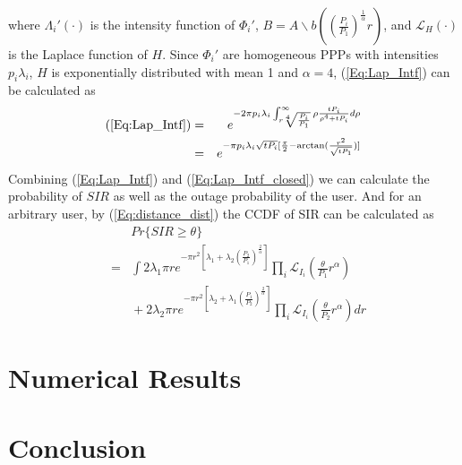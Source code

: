 \documentclass[a4paper,twocolumn]{IEEEtran}
\begin{document}
where $\Lambda_i'(\cdot)$ is the intensity function of $\Phi_i'$, $B=A\backslash b( ( \frac{P_i}{P_1} )^\frac{1}{\alpha} r)$, and $\mathcal{L}_H(\cdot)$ is the Laplace function of $H$. Since $\Phi_i'$ are homogeneous PPPs with intensities $p_i\lambda_i$, $H$ is exponentially distributed with mean 1 and $\alpha = 4$, (\ref{Eq:Lap_Intf}) can be calculated as
\begin{eqnarray}\label{Eq:Lap_Intf_closed}
(\ref{Eq:Lap_Intf})&=&e^{-2\pi p_i \lambda_i \int_{r\sqrt[4]{\frac{P_i}{P_1}}}^{\infty}\rho\frac{t P_i}{\rho^4 + t P_i}d\rho}\nonumber\\
&=&e^{-\pi p_i \lambda_i \sqrt{t P_i} [\frac{\pi}{2}-\arctan(\frac{r^2}{\sqrt{tP_1}})]} 
\end{eqnarray}
Combining (\ref{Eq:Lap_Intf}) and (\ref{Eq:Lap_Intf_closed}) we can calculate the probability of $SIR$ as well as the outage probability of the user. And for an arbitrary user, by (\ref{Eq:distance_dist}) the CCDF of SIR can be calculated as
\begin{eqnarray}
&&Pr\{SIR \geq \theta \}\nonumber\\
&=&\int 2\lambda_1 \pi r e^{-\pi r^2 [ \lambda_1 + \lambda_2 (\frac{P_2}{P_1})^\frac{2}{\alpha}]} \prod_{i} \mathcal{L}_{I_i} (\frac{\theta}{P_1} r^{\alpha})\nonumber\\
&&{}+2\lambda_2 \pi r e^{-\pi r^2 [ \lambda_2 + \lambda_1 (\frac{P_1}{P_2})^\frac{2}{\alpha}]} \prod_{i} \mathcal{L}_{I_i} (\frac{\theta}{P_2} r^{\alpha})dr\nonumber
\end{eqnarray}

       
\section{Numerical Results}\label{Sec:Num}
\section{Conclusion}\label{Sec:Con}

  
\end{document}
